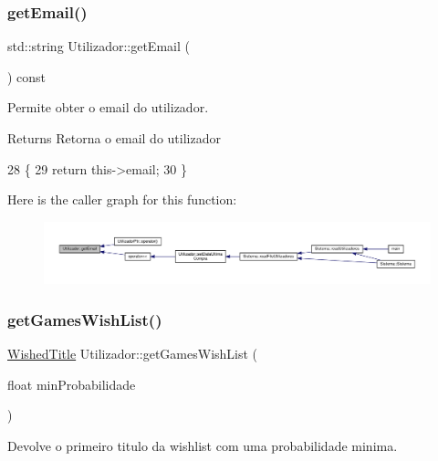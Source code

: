 \subsubsection{\texorpdfstring{get\+Email()}{getEmail()}}
{\footnotesize\ttfamily std\+::string Utilizador\+::get\+Email (\begin{DoxyParamCaption}{ }\end{DoxyParamCaption}) const}



Permite obter o email do utilizador. 

\begin{DoxyReturn}{Returns}
Retorna o email do utilizador 
\end{DoxyReturn}

\begin{DoxyCode}
28                                      \{
29     \textcolor{keywordflow}{return} this->email;
30 \}
\end{DoxyCode}
Here is the caller graph for this function\+:
\nopagebreak
\begin{figure}[H]
\begin{center}
\leavevmode
\includegraphics[width=350pt]{classUtilizador_aea88bb297704762d0cccc909b8c2da54_icgraph}
\end{center}
\end{figure}
\mbox{\label{classUtilizador_a9b80c93b8e8f7716e4ab77b2e1b47071}} 
\subsubsection{\texorpdfstring{get\+Games\+Wish\+List()}{getGamesWishList()}}
{\footnotesize\ttfamily \hyperlink{classWishedTitle}{Wished\+Title} Utilizador\+::get\+Games\+Wish\+List (\begin{DoxyParamCaption}\item[{float}]{min\+Probabilidade }\end{DoxyParamCaption})}



Devolve o primeiro titulo da wishlist com uma probabilidade minima. 


